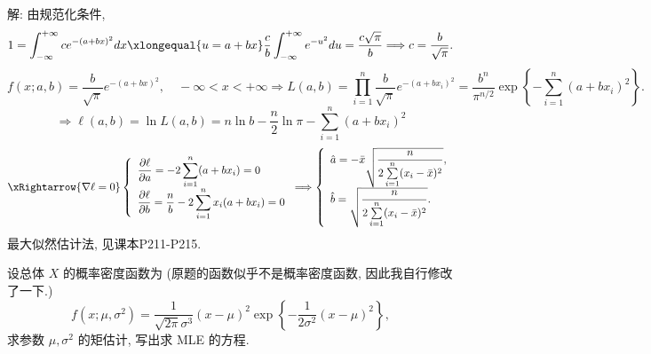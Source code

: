 \documentclass[standard]{ExBook}
\renewenvironment{shaded}{%
  \def\FrameCommand{\fboxsep=\FrameSep \colorbox{shadecolor}}%
  \MakeFramed{\advance\hsize-\width \FrameRestore}%
}{%
  \endMakeFramed
}
\begin{document}
\begin{qitems}
\vspace{\dimexpr2.5cm-5em\relax}

解: 由规范化条件,
$$
1=\int_{-\infty}^{+\infty}c e^{-(a+bx)^2}dx
\xlongequal{u=a+bx}
\frac{c}{b}\int_{-\infty}^{+\infty}e^{-u^2}du
=\frac{c\sqrt{\pi}}{b}
\Longrightarrow
c=\frac{b}{\sqrt{\pi}}.
$$
$$
f(x;a,b)=\frac{b}{\sqrt{\pi}}e^{-(a+bx)^2},\quad -\infty<x<+\infty
\Longrightarrow
L(a,b)
=\prod_{i=1}^{n}\frac{b}{\sqrt{\pi}}e^{-(a+bx_i)^2}
=\frac{b^n}{\pi^{n/2}}\exp\left\{-\sum_{i=1}^{n}(a+bx_i)^2\right\}.
$$
$$
\Longrightarrow
\ell(a,b)=\ln L(a,b)
=n\ln b-\frac{n}{2}\ln\pi-\sum_{i=1}^{n}(a+bx_i)^2
$$
$$
\xRightarrow{\nabla\ell=0}
\left\{
\begin{array}{l}
\displaystyle\frac{\partial \ell}{\partial a}
=-2\sum\limits_{i=1}^{n}(a+bx_i)=0\\[0.7em]
\displaystyle\frac{\partial \ell}{\partial b}
=\frac{n}{b}-2\sum\limits_{i=1}^{n}x_i(a+bx_i)=0
\end{array}
\right.
\Longrightarrow
\left\{
\begin{array}{l}
\hat{a}
=-\displaystyle\bar{x}\sqrt{\frac{n}{2\sum\limits_{i=1}^{n}(x_i-\bar{x})^2}},\\[0.7em]
\hat{b}
=\displaystyle\sqrt{\frac{n}{2\sum\limits_{i=1}^{n}(x_i-\bar{x})^2}}.
\end{array}
\right.
$$
\textcolor{themeColor}{\selectfont {} 最大似然估计法, 见课本P211-P215.}

\vspace{2.5cm-5em}

    \begin{bbox}
    \begin{shaded}
        \qitem
设总体 \(X\) 的概率密度函数为 (原题的函数似乎不是概率密度函数, 因此我自行修改了一下.)
\[f(x; \mu, \sigma^2) = \frac{1}{\sqrt{2\pi}\sigma^3}(x - \mu)^2 \exp\left\{-\frac{1}{2\sigma^2}(x - \mu)^2\right\},\]
求参数 \(\mu, \sigma^2\) 的矩估计, 写出求 MLE 的方程.
    \end{shaded}
    \end{bbox}

\vspace{\dimexpr2.5cm-5em\relax}


\end{qitems}
\end{document}
